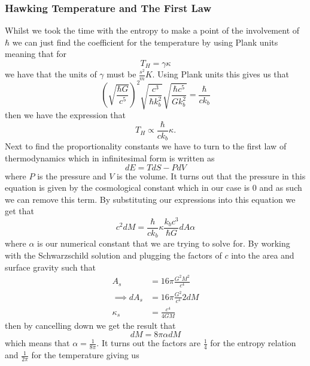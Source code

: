 \documentclass[12pt]{article}
\numberwithin{equation}{section}
\numberwithin{figure}{section}
\begin{document}
\subsubsection{Hawking Temperature and The First Law} %
\label{sub:hawking_temperature_and_the_first_law}
Whilst we took the time with the entropy to make a point of the involvement of $\hbar$ we can just find the coefficient for the temperature by using Plank units meaning that for
\begin{equation}
	T_{H} = \gamma\kappa
\end{equation}
we have that the units of $\gamma$ must be $\frac{s^{2}}{m}K$. Using Plank units this gives us that
\begin{equation}
	\left(\sqrt{\frac{\hbar G}{c^{5}}}\right)^{2}\sqrt{\frac{c^3}{\hbar k_{b}^{2}}}\sqrt{\frac{\hbar c^{5}}{G k_{b}^{2}}}= \frac{\hbar}{c k_{b}}
\end{equation}
then we have the expression that 
\begin{equation}
	T_{H}\propto \frac{\hbar}{c k_{b}}\kappa.
\end{equation}
Next to find the proportionality constants we have to turn to the first law of thermodynamics which in infinitesimal form is written as
\begin{equation}
	dE=TdS -PdV
\end{equation}
where $P$ is the pressure and $V$ is the volume. It turns out that the pressure in this equation is given by the cosmological constant which in our case is $0$ and as such we can remove this term. By substituting our expressions into this equation we get that
\begin{equation}
	c^{2}dM= \frac{\hbar}{c k_{b}}\kappa \frac{k_{b}c^{3}}{\hbar G}dA \alpha
\end{equation}
where $\alpha$ is our numerical constant that we are trying to solve for. By working with the Schwarzschild solution and plugging the factors of $c$ into the area and surface gravity such that 
\begin{align}
	A_{s} &= 16\pi \frac{G^{2}M^{2}}{c^{4}} \\
	\implies dA_{s} &= 16\pi \frac{G^{2}}{c^{4}} 2dM\\
	\kappa_{s} &= \frac{c^{4}}{4GM}
\end{align}
then by cancelling down we get the result that
\begin{equation}
	dM=8\pi \alpha dM
\end{equation}
which means that $\alpha=\frac{1}{8\pi}$. It turns out the factors are $\frac{1}{4}$ for the entropy relation and $\frac{1}{2\pi}$ for the temperature giving us
\end{document}
